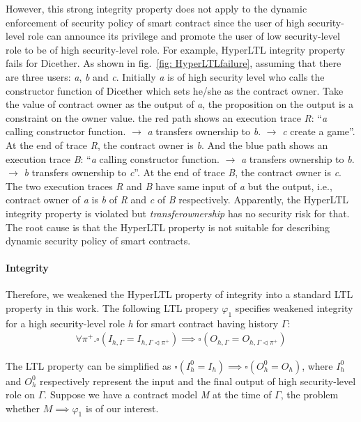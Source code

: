 However, this strong integrity property does not apply to the dynamic enforcement of security policy of smart contract
since the user of high security-level role can announce its privilege and promote the user of low security-level role to be of high security-level role.
For example, HyperLTL integrity property fails for Dicether. 
As shown in fig.~\ref{fig: HyperLTLfailure},
assuming that there are three users: \textit{a}, \textit{b} and \textit{c}. Initially \textit{a} is of high security level who calls the constructor function of Dicether which sets he/she as the contract owner. 
Take the value of contract owner as the output of \textit{a},
the proposition on the output is a constraint on the owner value. 
the red path shows an execution trace \textit{R}: ``\textit{a} calling constructor function. $\rightarrow$ \textit{a} transfers ownership to \textit{b}. $\rightarrow$ \textit{c} create a game''. 
At the end of trace \textit{R}, the contract owner is \textit{b}.
And the blue path shows an execution trace \textit{B}: ``\textit{a} calling constructor function. $\rightarrow$ \textit{a} transfers ownership to \textit{b}. $\rightarrow$ \textit{b} transfers ownership to \textit{c}''. 
At the end of trace \textit{B}, the contract owner is \textit{c}.
The two execution traces \textit{R} and \textit{B} have same input of \textit{a} 
but the output, i.e., contract owner of \textit{a} is \textit{b} of \textit{R} and \textit{c} of \textit{B} respectively. 
Apparently, the HyperLTL integrity property is violated but \textit{transferownership} has no security risk for that.
The root cause is that the HyperLTL property is not suitable for describing dynamic security policy of smart contracts. 



\paragraph{Integrity} 
Therefore, we weakened the HyperLTL property of integrity into a standard LTL property in this work.
The following LTL propery $\varphi_1$ specifies weakened integrity for a high security-level role \textit{h} for smart contract having history $\Gamma$:
\begin{align*}
	\forall \pi^{+}.\square (I_{h,\Gamma} = I_{h,\Gamma \triangleleft \pi^{+}})\implies \square (O_{h, \Gamma} = O_{h, \Gamma \triangleleft \pi^{+}})
\end{align*}

The LTL property can be simplified as $
\square (I_{h}^{0} = I_{h})\implies \square (O_{h}^{0} = O_{h})
$, where $I_{h}^{0}$ and $O_{h}^{0}$ respectively represent the input and the final output of high security-level role on $\Gamma$.
Suppose we have a contract model \textit{M} at the time of $\Gamma$, 
the problem whether $ M \implies \varphi_1$ is of our interest. 


